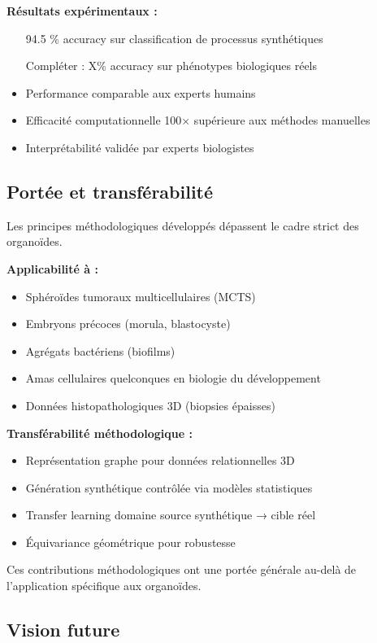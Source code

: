 \textbf{Résultats expérimentaux :}
\begin{itemize}
    \item [94.5]\% accuracy sur classification de processus synthétiques
    \item [Compléter : X\%] accuracy sur phénotypes biologiques réels
    \item Performance comparable aux experts humains
    \item Efficacité computationnelle 100× supérieure aux méthodes manuelles
    \item Interprétabilité validée par experts biologistes
\end{itemize}

\subsection{Portée et transférabilité}

Les principes méthodologiques développés dépassent le cadre strict des organoïdes.

\textbf{Applicabilité à :}
\begin{itemize}
    \item Sphéroïdes tumoraux multicellulaires (MCTS)
    \item Embryons précoces (morula, blastocyste)
    \item Agrégats bactériens (biofilms)
    \item Amas cellulaires quelconques en biologie du développement
    \item Données histopathologiques 3D (biopsies épaisses)
\end{itemize}

\textbf{Transférabilité méthodologique :}
\begin{itemize}
    \item Représentation graphe pour données relationnelles 3D
    \item Génération synthétique contrôlée via modèles statistiques
    \item Transfer learning domaine source synthétique → cible réel
    \item Équivariance géométrique pour robustesse
\end{itemize}

Ces contributions méthodologiques ont une portée générale au-delà de l'application spécifique aux organoïdes.

\subsection{Vision future}

